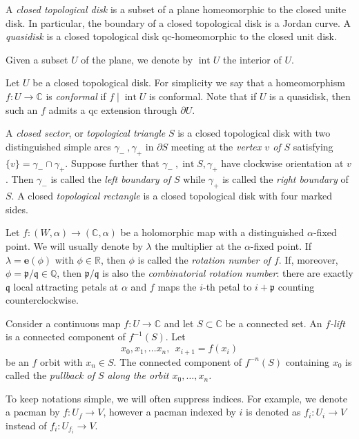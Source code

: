 \documentclass[]{amsart}
\renewcommand{\sp}{{\ \ }}
\newcommand\intr{\operatorname{int}}
\newcommand{\pp}{\mathfrak{p}}
\newcommand{\ee}{\mathbf e}
\renewcommand{\qq}{\mathfrak{q}}
\newcommand{\C}{\mathbb{C}}
\newcommand{\Q}{\mathbb{Q}}
\newcommand{\R}{\mathbb{R}}
\theoremstyle{remark}
\numberwithin{equation}{section}
\theoremstyle{definition}
\newcommand{\ra}{\rightarrow}
\begin{document}
A \emph{closed topological disk} is a subset of a plane homeomorphic to the closed unite disk. In particular, the boundary of a closed topological disk is a Jordan curve. A \emph{quasidisk} is a closed topological disk qc-homeomorphic to the closed unit disk.

Given a subset $U$ of the plane, we denote by $\intr U $ the interior of $U$.

Let $U$ be a closed topological disk. For simplicity we say that a homeomorphism $f\colon U\to \C$ is \emph{conformal} if $f\mid \intr U $ is conformal. Note that if $U$ is a quasidisk, then such an $f$ admits a qc extension through $\partial U$. 



A \emph{closed sector}, or \emph{topological triangle} $S$ is a closed topological disk with two distinguished simple arcs $\gamma_-~,\gamma_+$ in $\partial S$ meeting at the \emph{vertex $v$ of $S$} satisfying $\{v\}=\gamma_-\cap \gamma_+$. Suppose further that $\gamma_-~,\intr S, \gamma_+$ have clockwise orientation at $v$. Then $\gamma_-$ is called the \emph{left boundary of $S$} while $\gamma_+$ is called the \emph{right boundary} of $S$. A closed \emph{topological rectangle} is a closed topological disk with four marked sides.



Let $f : (W, \alpha) \ra (\C, \alpha)$  be a holomorphic map with a distinguished $\alpha$-fixed point. We will usually denote by $\lambda$ the multiplier at the $\alpha$-fixed point. If $\lambda=\ee(\phi)$ with $\phi\in \R$, then $\phi$ is called the \emph{rotation number of $f$}. If, moreover, $\phi=\pp/\qq\in \Q$, then $\pp/\qq$ is also the \emph{combinatorial rotation number}: there are exactly $\qq$ local attracting petals at $\alpha$ and $f$ maps the $i$-th petal to $i+\pp$ counting counterclockwise.


Consider a continuous map $f\colon U\to \C$ and let $S\subset \C$ be a connected set. An \emph{$f$-lift} is a connected component of $f^{-1}(S)$. Let \[x_0,x_1,\dots x_n,\sp x_{i+1}=f(x_i)\]
be an $f$ orbit with $x_n\in S$. The connected component of $f^{-n}(S)$ containing $x_0$ is called the \emph{pullback of $S$ along the orbit $x_0,\dots, x_n$.}



To keep notations simple, we will often suppress indices. For example, we denote a pacman by $f\colon U_f\to V$, however a pacman indexed by $i$ is denoted as $f_i\colon U_i\to V$ instead of $f_i\colon U_{f_i}\to V$.
\end{document}
